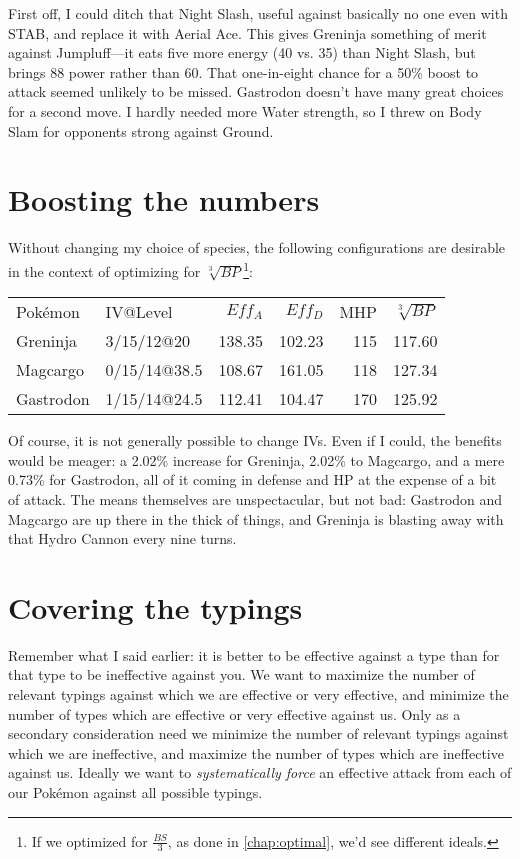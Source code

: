 First off, I could ditch that Night Slash, useful against basically no one even with STAB,
  and replace it with Aerial Ace.
This gives Greninja something of merit against Jumpluff---it eats five more energy
  (40 vs. 35) than Night Slash, but brings 88 power rather than 60.
That one-in-eight chance for a 50\% boost to attack seemed unlikely to be missed.
Gastrodon doesn't have many great choices for a second move.
I hardly needed more Water strength, so I threw on Body Slam for opponents strong
  against Ground.

\section{Boosting the numbers}
Without changing my choice of species, the following configurations are desirable
  in the context of optimizing for $\sqrt[3]{BP}$\footnote{If we optimized for $\frac{BS}{3}$,
   as done in \autoref{chap:optimal}, we'd see different ideals.}:
\begin{center}
\begin{tabular}{llrrrr}
  Pokémon & IV@Level & $Eff_A$ & $Eff_D$ & MHP & $\sqrt[3]{BP}$\\
  \Midrule
  Greninja & 3/15/12@20 & 138.35 & 102.23 & 115 & 117.60\\
  Magcargo & 0/15/14@38.5 & 108.67 & 161.05 & 118 & 127.34\\
  Gastrodon & 1/15/14@24.5 & 112.41 & 104.47 & 170 & 125.92\\
\end{tabular}
\end{center}
Of course, it is not generally possible to change IVs.
Even if I could, the benefits would be meager: a 2.02\% increase for Greninja,
  2.02\% to Magcargo, and a mere 0.73\% for Gastrodon, all of it coming
  in defense and HP at the expense of a bit of attack.
The means themselves are unspectacular, but not bad: Gastrodon and Magcargo are up there
  in the thick of things, and Greninja is blasting away with that Hydro Cannon every nine turns.

\section{Covering the typings}
Remember what I said earlier: it is better to be effective against a type than for that
  type to be ineffective against you.
We want to maximize the number of relevant typings against which we are effective or
  very effective, and minimize the number of types which are effective or very effective against us.
Only as a secondary consideration need we minimize the number of relevant
  typings against which we are ineffective, and maximize the number of types
  which are ineffective against us.
Ideally we want to \textit{systematically force} an effective attack from each
  of our Pokémon against all possible typings.


